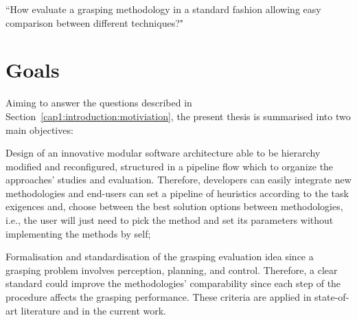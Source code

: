 \begin{flushright}
``How evaluate a grasping methodology in a standard fashion allowing easy comparison between different techniques?"
\end{flushright}



\section{Goals}

Aiming to answer the questions described in Section~\ref{cap1:introduction:motiviation}, the present thesis is summarised into two main objectives:


\begin{itemize_jp}

    \item Design of an innovative modular software architecture able to be hierarchy modified and reconfigured, structured in a pipeline flow which to organize the approaches' studies and evaluation. Therefore, developers can easily integrate new methodologies and end-users can set a pipeline of heuristics according to the task exigences and, choose between the best solution options between methodologies, i.e., the user will just need to pick the method and set its parameters without implementing the methods by self; 

    \item Formalisation and standardisation of the grasping evaluation idea since a grasping problem involves perception, planning, and control. Therefore, a clear standard could improve the methodologies' comparability since each step of the procedure affects the grasping performance. These criteria are applied in state-of-art literature and in the current work.

    
\end{itemize_jp}

